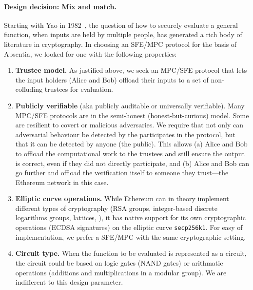 \paragraph{Design decision: Mix and match.} Starting with Yao in 1982~\cite{Yao82}, the question of how to securely evaluate a general function, when inputs are held by multiple people, has generated a rich body of literature in cryptography. In choosing an SFE/MPC protocol for the basis of Absentia, we looked for one with the following properties:

\begin{enumerate}
\item \textbf{Trustee model.} As justified above, we seek an MPC/SFE protocol that lets the input holders (\eg Alice and Bob) offload their inputs to a set of non-colluding trustees for evaluation. 
\item \textbf{Publicly verifiable} (aka publicly auditable or universally verifiable). Many MPC/SFE protocols are in the semi-honest (\ie honest-but-curious) model. Some are resilient to covert or malicious adversaries. We require that not only can adversarial behaviour  be detected by the participates in the protocol, but that it can be detected by anyone (\ie the public). This allows (a) Alice and Bob to offload the computational work to the trustees and still ensure the output is correct, even if they did not directly participate, and (b) Alice and Bob can go further and offload the verification itself to someone they trust---the Ethereum network in this case.
\item \textbf{Elliptic curve operations.} While Ethereum can in theory implement different types of cryptography (RSA groups, integer-based discrete logarithms groups, lattices, \etc), it has native support for its own cryptographic operations (ECDSA signatures) on the elliptic curve \texttt{secp256k1}. For easy of implementation, we prefer a SFE/MPC with the same cryptographic setting. 
\item \textbf{Circuit type.} When the function to be evaluated is represented as a circuit, the circuit could be based on logic gates (\ie NAND gates) or arithmatic operations (\eg additions and multiplications in a modular group). We are indifferent to this design parameter.
\end{enumerate}

